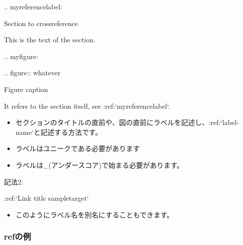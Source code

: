 \documentclass[letterpaper,10pt,dvipdfmx,openany,oneside]{sphinxmanual}
\begin{document}
%
\begin{sphinxVerbatim}[commandchars=\\\{\}]
.. \PYGZus{}my\PYGZhy{}reference\PYGZhy{}label:

Section to cross\PYGZhy{}reference
\PYGZhy{}\PYGZhy{}\PYGZhy{}\PYGZhy{}\PYGZhy{}\PYGZhy{}\PYGZhy{}\PYGZhy{}\PYGZhy{}\PYGZhy{}\PYGZhy{}\PYGZhy{}\PYGZhy{}\PYGZhy{}\PYGZhy{}\PYGZhy{}\PYGZhy{}\PYGZhy{}\PYGZhy{}\PYGZhy{}\PYGZhy{}\PYGZhy{}\PYGZhy{}\PYGZhy{}\PYGZhy{}\PYGZhy{}

This is the text of the section.

.. \PYGZus{}my\PYGZhy{}figure:

.. figure:: whatever

   Figure caption

It refers to the section itself, see :ref:{}`my\PYGZhy{}reference\PYGZhy{}label{}`.
\end{sphinxVerbatim}
\begin{itemize}
\item {} 
セクションのタイトルの直前や、図の直前にラベルを記述し、:ref:{}`label-name{}`と記述する方法です。

\item {} 
ラベルはユニークである必要があります

\item {} 
ラベルは\_(アンダースコア)で始まる必要があります。

\end{itemize}

記法2:

%
\begin{sphinxVerbatim}[commandchars=\\\{\}]
:ref:{}`Link title \PYGZlt{}sample\PYGZhy{}target\PYGZgt{}{}`
\end{sphinxVerbatim}
\begin{itemize}
\item {} 
このようにラベル名を別名にすることもできます。

\end{itemize}


\subsubsection{refの例}
\label{\detokenize{1.chapter/roles:id1}}
{\hyperref[\detokenize{1.chapter/roles:sample-target}]{}}

{\hyperref[\detokenize{1.chapter/basic_syntax:figure-reference}]{}}
\end{document}
